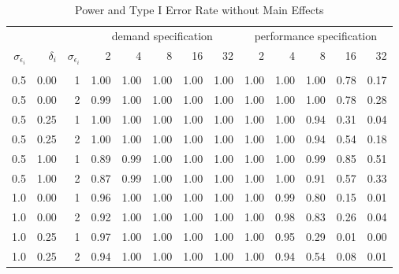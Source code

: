 \begin{table}

\caption{\label{tab:big-main-table}Power and Type I Error Rate without Main Effects}
\centering
\fontsize{8}{10}\selectfont
\begin{threeparttable}
\begin{tabular}[t]{rrrrrrrrrrrrr}
\toprule
\multicolumn{3}{c}{ } & \multicolumn{5}{c}{demand specification} & \multicolumn{5}{c}{performance specification} \\
\cmidrule(l{3pt}r{3pt}){4-8} \cmidrule(l{3pt}r{3pt}){9-13}
$\sigma_{\epsilon_i}$ & $\delta_i$ & $\sigma_{\epsilon_i}$ & 2 & 4 & 8 & 16 & 32 & 2 & 4 & 8 & 16 & 32\\
\midrule
\addlinespace[0.3em]
\multicolumn{13}{c}{\textbf{Power}}\\
\hspace{1em}0.5 & 0.00 & 1 & 1.00 & 1.00 & 1.00 & 1.00 & 1.00 & 1.00 & 1.00 & 1.00 & 0.78 & 0.17\\
\hspace{1em}0.5 & 0.00 & 2 & 0.99 & 1.00 & 1.00 & 1.00 & 1.00 & 1.00 & 1.00 & 1.00 & 0.78 & 0.28\\
\hspace{1em}0.5 & 0.25 & 1 & 1.00 & 1.00 & 1.00 & 1.00 & 1.00 & 1.00 & 1.00 & 0.94 & 0.31 & 0.04\\
\hspace{1em}0.5 & 0.25 & 2 & 1.00 & 1.00 & 1.00 & 1.00 & 1.00 & 1.00 & 1.00 & 0.94 & 0.54 & 0.18\\
\hspace{1em}0.5 & 1.00 & 1 & 0.89 & 0.99 & 1.00 & 1.00 & 1.00 & 1.00 & 1.00 & 0.99 & 0.85 & 0.51\\
\hspace{1em}0.5 & 1.00 & 2 & 0.87 & 0.99 & 1.00 & 1.00 & 1.00 & 1.00 & 1.00 & 0.91 & 0.57 & 0.33\\
\hspace{1em}1.0 & 0.00 & 1 & 0.96 & 1.00 & 1.00 & 1.00 & 1.00 & 1.00 & 0.99 & 0.80 & 0.15 & 0.01\\
\hspace{1em}1.0 & 0.00 & 2 & 0.92 & 1.00 & 1.00 & 1.00 & 1.00 & 1.00 & 0.98 & 0.83 & 0.26 & 0.04\\
\hspace{1em}1.0 & 0.25 & 1 & 0.97 & 1.00 & 1.00 & 1.00 & 1.00 & 1.00 & 0.95 & 0.29 & 0.01 & 0.00\\
\hspace{1em}1.0 & 0.25 & 2 & 0.94 & 1.00 & 1.00 & 1.00 & 1.00 & 1.00 & 0.94 & 0.54 & 0.08 & 0.01\\

\end{tabular}
\end{threeparttable}
\end{table}
